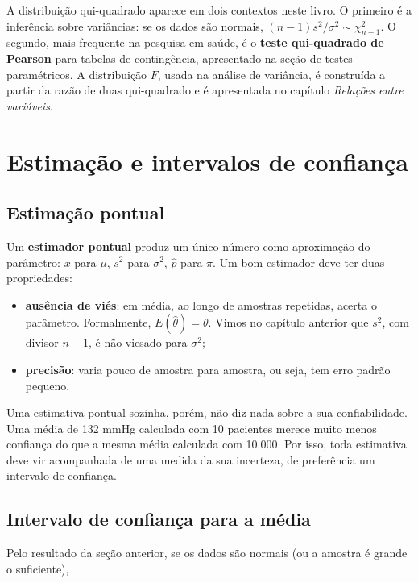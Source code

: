 \documentclass[
]{book}
\providecommand{\tightlist}{%
  \setlength{\itemsep}{0pt}\setlength{\parskip}{0pt}}
\begin{document}
A distribuição qui-quadrado aparece em dois contextos neste livro. O primeiro é a inferência sobre variâncias: se os dados são normais, \((n-1)s^2/\sigma^2 \sim \chi^2_{n-1}\). O segundo, mais frequente na pesquisa em saúde, é o \textbf{teste qui-quadrado de Pearson} para tabelas de contingência, apresentado na seção de testes paramétricos. A distribuição \(F\), usada na análise de variância, é construída a partir da razão de duas qui-quadrado e é apresentada no capítulo \emph{Relações entre variáveis}.

\section{Estimação e intervalos de confiança}\label{estimauxe7uxe3o-e-intervalos-de-confianuxe7a}

\subsection{Estimação pontual}\label{estimauxe7uxe3o-pontual}

Um \textbf{estimador pontual} produz um único número como aproximação do parâmetro: \(\bar{x}\) para \(\mu\), \(s^2\) para \(\sigma^2\), \(\hat{p}\) para \(\pi\). Um bom estimador deve ter duas propriedades:

\begin{itemize}
\tightlist
\item
  \textbf{ausência de viés}: em média, ao longo de amostras repetidas, acerta o parâmetro. Formalmente, \(E(\hat{\theta}) = \theta\). Vimos no capítulo anterior que \(s^2\), com divisor \(n - 1\), é não viesado para \(\sigma^2\);
\item
  \textbf{precisão}: varia pouco de amostra para amostra, ou seja, tem erro padrão pequeno.
\end{itemize}

Uma estimativa pontual sozinha, porém, não diz nada sobre a sua confiabilidade. Uma média de 132 mmHg calculada com 10 pacientes merece muito menos confiança do que a mesma média calculada com 10.000. Por isso, toda estimativa deve vir acompanhada de uma medida da sua incerteza, de preferência um intervalo de confiança.

\subsection{Intervalo de confiança para a média}\label{intervalo-de-confianuxe7a-para-a-muxe9dia}

Pelo resultado da seção anterior, se os dados são normais (ou a amostra é grande o suficiente),
\end{document}
